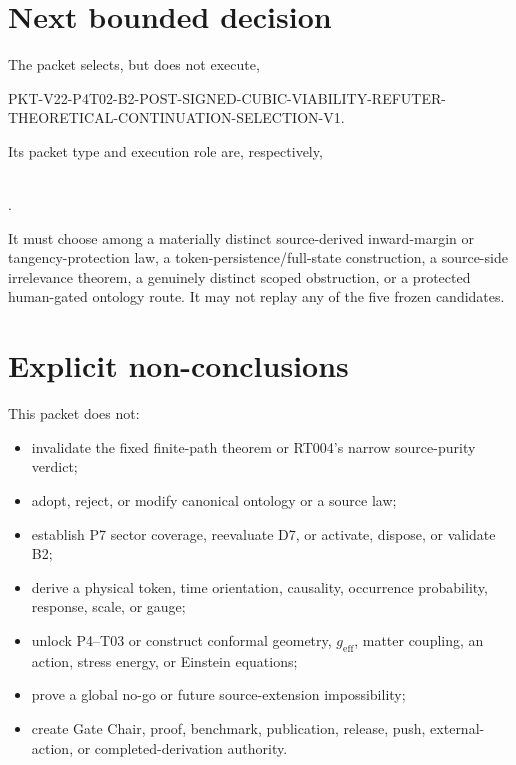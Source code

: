 \documentclass[11pt]{article}
\begin{document}
\section{Next bounded decision}

The packet selects, but does not execute,
\begin{flushleft}
\small\ttfamily
PKT-V22-P4T02-B2-POST-SIGNED-CUBIC-VIABILITY-REFUTER-\\
THEORETICAL-CONTINUATION-SELECTION-V1.
\end{flushleft}
Its packet type and execution role are, respectively,
\begin{center}
\small
{}\\
.
\end{center}
It must choose among a
materially distinct source-derived inward-margin or tangency-protection law,
a token-persistence/full-state construction, a source-side irrelevance theorem,
a genuinely distinct scoped obstruction, or a protected human-gated ontology
route.  It may not replay any of the five frozen candidates.

\section{Explicit non-conclusions}

This packet does not:
\begin{itemize}
 \item invalidate the fixed finite-path theorem or RT004's narrow source-purity verdict;
 \item adopt, reject, or modify canonical ontology or a source law;
 \item establish P7 sector coverage, reevaluate D7, or activate, dispose, or validate B2;
 \item derive a physical token, time orientation, causality, occurrence probability, response, scale, or gauge;
 \item unlock P4--T03 or construct conformal geometry, $g_{\mathrm{eff}}$, matter coupling, an action, stress energy, or Einstein equations;
 \item prove a global no-go or future source-extension impossibility;
 \item create Gate Chair, proof, benchmark, publication, release, push, external-action, or completed-derivation authority.
\end{itemize}
\end{document}
